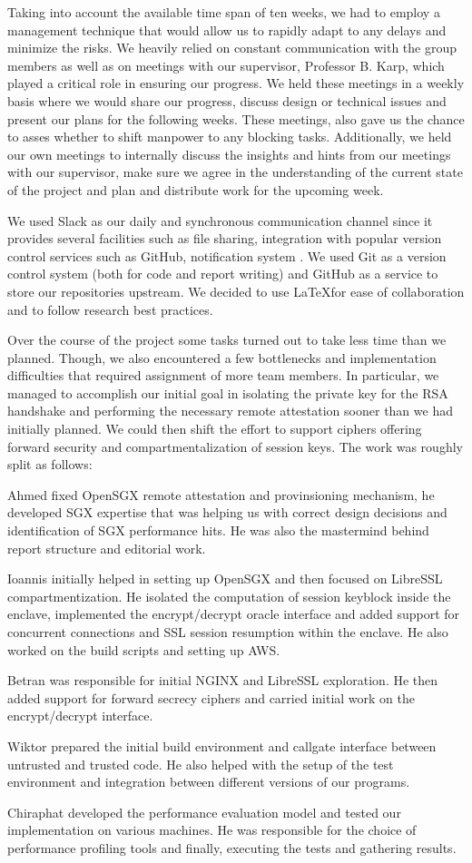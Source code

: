 \documentclass[../main.tex]{subfiles}
\begin{document}
Taking into account the available time span of ten weeks, we had to employ a
management technique that would allow us to rapidly adapt to any delays and
minimize the risks. We heavily relied on constant communication with the group
members as well as on meetings with our supervisor, Professor B. Karp, which
played a critical role in ensuring our progress. We held these meetings in a
weekly basis where we would share our progress, discuss design or technical
issues and present our plans for the following weeks. These meetings, also gave
us the chance to asses whether to shift manpower to any blocking tasks.
Additionally, we held our own meetings to internally discuss the insights and
hints from our meetings with our supervisor, make sure we agree in the
understanding of the current state of the project and plan and distribute work
for the upcoming week.

We used Slack as our daily and synchronous communication channel since it
provides several facilities such as file sharing, integration with popular
version control services such as GitHub, notification system \etc. We used
Git as a version control system (both for code and report writing) and GitHub
as a service to store our repositories upstream. We decided to use \LaTeX for
ease of collaboration and to follow research best practices.

Over the course of the project some tasks turned out to take less time than we
planned. Though, we also encountered a few bottlenecks and implementation
difficulties that required assignment of more team members. In particular, we
managed to accomplish our initial goal in isolating the private key for the RSA
handshake and performing the necessary remote attestation sooner than we had
initially planned. We could then shift the effort to support ciphers offering
forward security and compartmentalization of session keys. The work was roughly
split as follows:

Ahmed fixed OpenSGX remote attestation and provinsioning mechanism, he
developed SGX expertise that was helping us with correct design decisions and
identification of SGX performance hits. He was also the mastermind behind
report structure and editorial work.

Ioannis initially helped in setting up OpenSGX and then focused on LibreSSL
compartmentization. He isolated the computation of session keyblock inside the
enclave, implemented the encrypt/decrypt oracle interface and added support
for concurrent connections and SSL session resumption within the enclave. He
also worked on the build scripts and setting up AWS.

Betran was responsible for initial NGINX and LibreSSL exploration. He then
added support for forward secrecy ciphers and carried initial work on the
encrypt/decrypt interface.

Wiktor prepared the initial build environment and callgate interface between
untrusted and trusted code. He also helped with the setup of the test
environment and integration between different versions of our programs.

Chiraphat developed the performance evaluation model and tested our
implementation on various machines. He was responsible for the choice of
performance profiling tools and finally, executing the tests and gathering
results.
\end{document}
